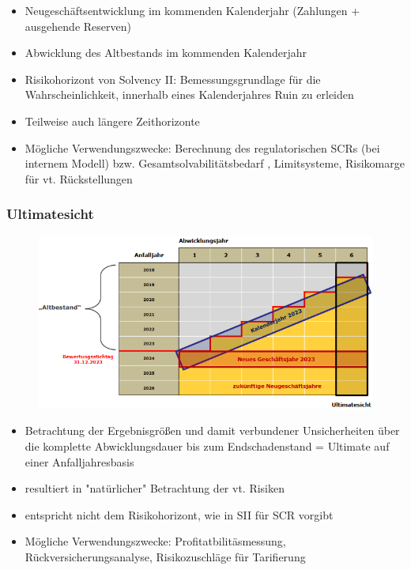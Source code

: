\documentclass[12pt]{report}
\theoremstyle{dotless}
\theoremstyle{definition}
\begin{document}
\begin{itemize}
\item Neugeschäftsentwicklung im kommenden Kalenderjahr (Zahlungen + ausgehende Reserven)
\item Abwicklung des Altbestands im kommenden Kalenderjahr
\item Risikohorizont von Solvency II: Bemessungsgrundlage für die Wahrscheinlichkeit, innerhalb eines Kalenderjahres Ruin zu erleiden
\item Teilweise auch längere Zeithorizonte
\item Mögliche Verwendungszwecke: Berechnung des regulatorischen SCRs (bei internem Modell) bzw. Gesamtsolvabilitätsbedarf , Limitsysteme, Risikomarge für vt. Rückstellungen
\end{itemize}

\subsubsection{Ultimatesicht}

\begin{figure}[ht]
	\centering
	\includegraphics[width= \textwidth]{Bilder/Ultimatesicht.png}
\end{figure}

\begin{itemize}
\item Betrachtung der Ergebnisgrößen und damit verbundener Unsicherheiten über die komplette Abwicklungsdauer bis zum Endschadenstand = Ultimate auf einer Anfalljahresbasis
\item resultiert in "natürlicher" Betrachtung der vt. Risiken
\item entspricht nicht dem Risikohorizont, wie in SII für SCR vorgibt
\item Mögliche Verwendungszwecke: Profitatbilitäsmessung, Rückversicherungsanalyse, Risikozuschläge für Tarifierung
\end{itemize}
\end{document}
